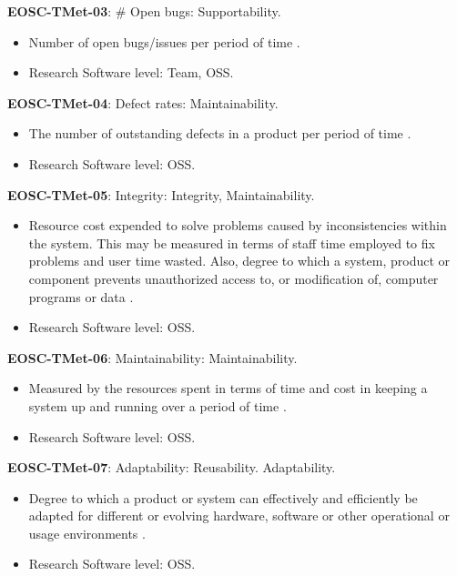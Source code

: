 \textbf{EOSC-TMet-03}: \# Open bugs: Supportability.

\begin{itemize}
    \item Number of open bugs/issues per period of time \cite{montagud_systematic_2012}.
    \item Research Software level: Team, OSS.
\end{itemize}

\textbf{EOSC-TMet-04}: Defect rates: Maintainability.

\begin{itemize}
    \item The number of outstanding defects in a product per period of time \cite{crispin_driving_2006}.
    \item Research Software level: OSS.
\end{itemize}

\textbf{EOSC-TMet-05}: Integrity: Integrity, Maintainability.

\begin{itemize}
    \item Resource cost expended to solve problems caused by inconsistencies within the system. This may be measured in terms of staff time employed to fix problems and user time wasted. Also, degree to which a system, product or component prevents unauthorized access to, or modification of, computer programs or data \cite{iso_25010_2011_2017,gillies_modelling_1992}.
    \item Research Software level: OSS.
\end{itemize}

\textbf{EOSC-TMet-06}: Maintainability: Maintainability.

\begin{itemize}
    \item Measured by the resources spent in terms of time and cost in keeping a system up and running over a period of time \cite{gillies_modelling_1992,boehm_quantitative_1976}.
    \item Research Software level: OSS.
\end{itemize}

\textbf{EOSC-TMet-07}: Adaptability: Reusability. Adaptability.

\begin{itemize}
    \item Degree to which a product or system can effectively and efficiently be adapted for different or evolving hardware, software or other operational or usage environments \cite{iso_25010_2011_2017,gillies_modelling_1992,boehm_quantitative_1976}.
    \item Research Software level: OSS.
\end{itemize}

